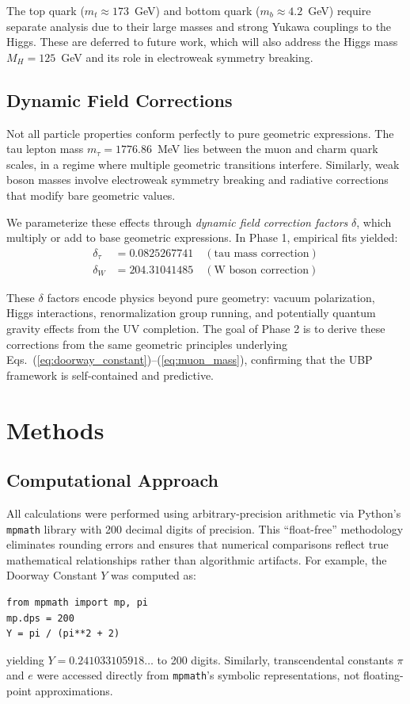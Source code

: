\documentclass[11pt,a4paper]{article}
\begin{document}
The top quark ($m_t \approx 173$~GeV) and bottom quark ($m_b \approx 4.2$~GeV) require separate analysis due to their large masses and strong Yukawa couplings to the Higgs. These are deferred to future work, which will also address the Higgs mass $M_H = 125$~GeV and its role in electroweak symmetry breaking.

\subsection{Dynamic Field Corrections}

Not all particle properties conform perfectly to pure geometric expressions. The tau lepton mass $m_\tau = 1776.86$~MeV lies between the muon and charm quark scales, in a regime where multiple geometric transitions interfere. Similarly, weak boson masses involve electroweak symmetry breaking and radiative corrections that modify bare geometric values.

We parameterize these effects through \emph{dynamic field correction factors} $\delta$, which multiply or add to base geometric expressions. In Phase 1, empirical fits yielded:
\begin{align}
\delta_\tau &= 0.0825267741 \quad (\text{tau mass correction}) \\
\delta_W &= 204.31041485 \quad (\text{W boson correction})
\end{align}

These $\delta$ factors encode physics beyond pure geometry: vacuum polarization, Higgs interactions, renormalization group running, and potentially quantum gravity effects from the UV completion. The goal of Phase 2 is to derive these corrections from the same geometric principles underlying Eqs.~(\ref{eq:doorway_constant})--(\ref{eq:muon_mass}), confirming that the UBP framework is self-contained and predictive.

\section{Methods}

\subsection{Computational Approach}

All calculations were performed using arbitrary-precision arithmetic via Python's \texttt{mpmath} library with 200 decimal digits of precision. This ``float-free'' methodology eliminates rounding errors and ensures that numerical comparisons reflect true mathematical relationships rather than algorithmic artifacts. For example, the Doorway Constant $Y$ was computed as:
\begin{verbatim}
from mpmath import mp, pi
mp.dps = 200
Y = pi / (pi**2 + 2)
\end{verbatim}
yielding $Y = 0.241033105918\ldots$ to 200 digits. Similarly, transcendental constants $\pi$ and $e$ were accessed directly from \texttt{mpmath}'s symbolic representations, not floating-point approximations.
\end{document}
